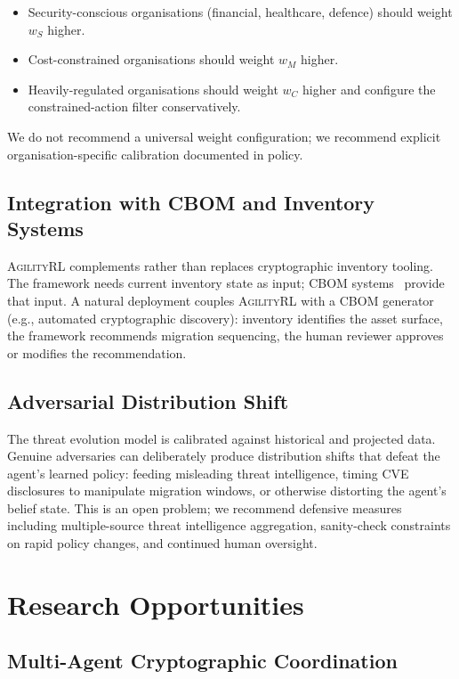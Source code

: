 \documentclass[sigconf,nonacm]{acmart}
\begin{document}
\begin{itemize}
  \item Security-conscious organisations (financial, healthcare,
        defence) should weight $w_S$ higher.
  \item Cost-constrained organisations should weight $w_M$ higher.
  \item Heavily-regulated organisations should weight $w_C$ higher
        and configure the constrained-action filter conservatively.
\end{itemize}

We do not recommend a universal weight configuration; we recommend
explicit organisation-specific calibration documented in policy.

\subsection{Integration with CBOM and Inventory Systems}

\textsc{AgilityRL} complements rather than replaces cryptographic
inventory tooling. The framework needs current inventory state as
input; CBOM systems~\cite{cyclonedx2024crypto} provide that input.
A natural deployment couples \textsc{AgilityRL} with a CBOM
generator (e.g., automated cryptographic discovery): inventory
identifies the asset surface, the framework recommends migration
sequencing, the human reviewer approves or modifies the
recommendation.

\subsection{Adversarial Distribution Shift}

The threat evolution model is calibrated against historical and
projected data. Genuine adversaries can deliberately produce
distribution shifts that defeat the agent's learned policy: feeding
misleading threat intelligence, timing CVE disclosures to manipulate
migration windows, or otherwise distorting the agent's belief state.
This is an open problem; we recommend defensive measures including
multiple-source threat intelligence aggregation, sanity-check
constraints on rapid policy changes, and continued human oversight.

\section{Research Opportunities}

\subsection{Multi-Agent Cryptographic Coordination}
\end{document}
